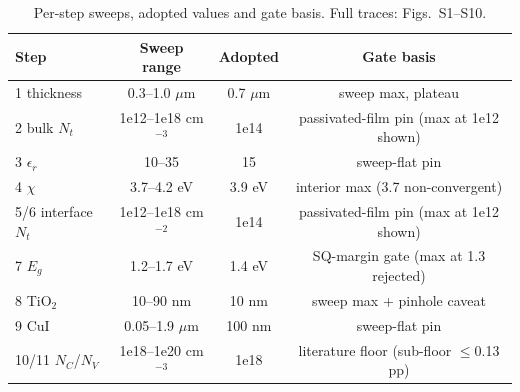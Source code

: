\documentclass[12pt]{article}
\begin{document}
\begin{table}[htbp]
\centering
{\footnotesize\setlength{\tabcolsep}{3pt}
\begin{tabularx}{\textwidth}{Xccc}
\hline
Step & Sweep range & Adopted & Gate basis
\\\hline
1 thickness & 0.3--1.0 $\mu$m & 0.7 $\mu$m & sweep max, plateau \\
2 bulk $N_{t}$ & 1e12--1e18 cm$^{-3}$ & 1e14 & passivated-film pin (max at 1e12 shown) \\
3 $\epsilon_{r}$ & 10--35 & 15 & sweep-flat pin \\
4 $\chi$ & 3.7--4.2 eV & 3.9 eV & interior max (3.7 non-convergent) \\
5/6 interface $N_{t}$ & 1e12--1e18 cm$^{-2}$ & 1e14 & passivated-film pin (max at 1e12 shown) \\
7 $E_{g}$ & 1.2--1.7 eV & 1.4 eV & SQ-margin gate (max at 1.3 rejected) \\
8 TiO$_{2}$ & 10--90 nm & 10 nm & sweep max + pinhole caveat \\
9 CuI & 0.05--1.9 $\mu$m & 100 nm & sweep-flat pin \\
10/11 $N_{C}$/$N_{V}$ & 1e18--1e20 cm$^{-3}$ & 1e18 & literature floor (sub-floor $\le$0.13 pp) \\
\hline
\end{tabularx}
}
\caption{Per-step sweeps, adopted values and gate basis. Full traces: Figs.~S1--S10.}
\end{table}
\end{document}
